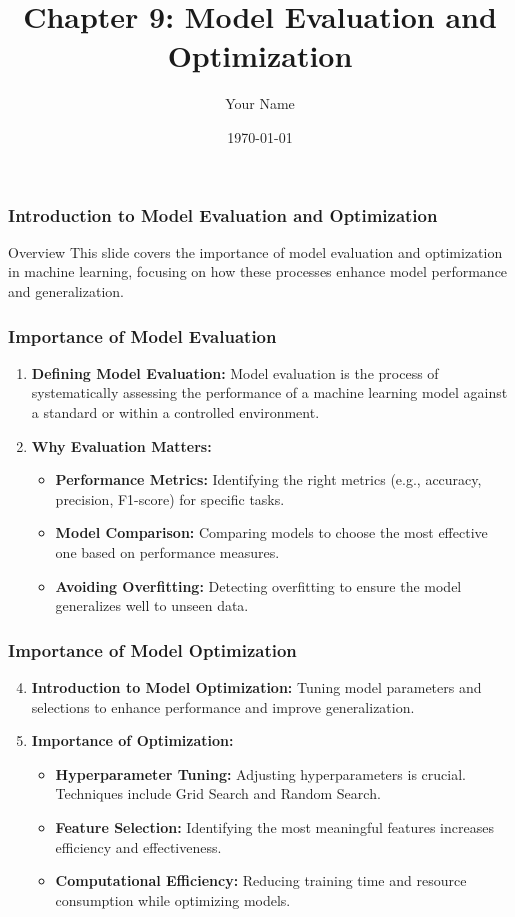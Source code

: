 \documentclass{beamer}
\title{Chapter 9: Model Evaluation and Optimization}
\author{Your Name}
\institute{Your Institution}
\date{\today}
\begin{document}
\frame{\titlepage}

\begin{frame}[fragile]
    \frametitle{Introduction to Model Evaluation and Optimization}
    \begin{block}{Overview}
        This slide covers the importance of model evaluation and optimization in machine learning, focusing on how these processes enhance model performance and generalization.
    \end{block}
\end{frame}

\begin{frame}[fragile]
    \frametitle{Importance of Model Evaluation}
    \begin{enumerate}
        \item \textbf{Defining Model Evaluation:} 
        Model evaluation is the process of systematically assessing the performance of a machine learning model against a standard or within a controlled environment.
        
        \item \textbf{Why Evaluation Matters:}
        \begin{itemize}
            \item \textbf{Performance Metrics:} Identifying the right metrics (e.g., accuracy, precision, F1-score) for specific tasks.
            \item \textbf{Model Comparison:} Comparing models to choose the most effective one based on performance measures.
            \item \textbf{Avoiding Overfitting:} Detecting overfitting to ensure the model generalizes well to unseen data.
        \end{itemize}
    \end{enumerate}
\end{frame}

\begin{frame}[fragile]
    \frametitle{Importance of Model Optimization}
    \begin{enumerate}
        \setcounter{enumi}{3}
        \item \textbf{Introduction to Model Optimization:} 
        Tuning model parameters and selections to enhance performance and improve generalization.
        
        \item \textbf{Importance of Optimization:}
        \begin{itemize}
            \item \textbf{Hyperparameter Tuning:} Adjusting hyperparameters is crucial. Techniques include Grid Search and Random Search.
            \item \textbf{Feature Selection:} Identifying the most meaningful features increases efficiency and effectiveness.
            \item \textbf{Computational Efficiency:} Reducing training time and resource consumption while optimizing models.
        \end{itemize}
    \end{enumerate}
\end{frame}
\end{document}
